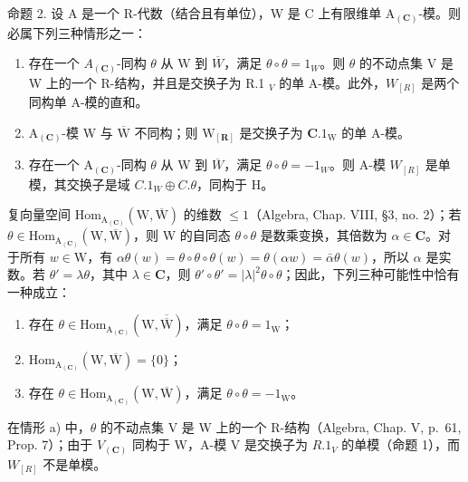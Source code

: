 命题 2. 设 A 是一个 R-代数（结合且有单位），W 是 C 上有限维单 \(\mathrm{A}_{(\mathbf{C})}\)-模。则必属下列三种情形之一：

\begin{enumerate}
\def\labelenumi{\alph{enumi})}
\item
  存在一个 \(A_{(\mathbf{C})}\)-同构 \(\theta\) 从 W 到 \(\overline{W}\)，满足 \(\theta \circ \theta = 1_{W}\)。则 \(\theta\) 的不动点集 V 是 W 上的一个 R-结构，并且是交换子为 R.1 \(_{V}\) 的单 A-模。此外，\(W_{[R]}\) 是两个同构单 A-模的直和。
\item
  \(\mathrm{A}_{(\mathbf{C})}\)-模 W 与 \(\overline{\mathrm{W}}\) 不同构；则 \(\mathrm{W}_{[\mathbf{R}]}\) 是交换子为 \(\mathbf{C}.1_{\mathrm{W}}\) 的单 A-模。
\item
  存在一个 \(\mathrm{A}_{(\mathbf{C})}\)-同构 \(\theta\) 从 W 到 \(\overline{W}\)，满足 \(\theta \circ \theta = -1_{W}\)。则 A-模 \(W_{[R]}\) 是单模，其交换子是域 \(C.1_{W} \oplus C.\theta\)，同构于 H。
\end{enumerate}

复向量空间 \(\mathrm{Hom}_{\mathrm{A}_{(\mathbf{C})}}(\mathrm{W},\overline{\mathrm{W}})\) 的维数 \(\leq 1\)（Algebra, Chap. VIII, §3, no. 2）；若 \(\theta \in \mathrm{Hom}_{\mathrm{A}_{(\mathbf{C})}}(\mathrm{W},\overline{\mathrm{W}})\)，则 W 的自同态 \(\theta \circ \theta\) 是数乘变换，其倍数为 \(\alpha \in \mathbf{C}\)。对于所有 \(w \in \mathrm{W}\)，有 \(\alpha \theta(w) = \theta \circ \theta \circ \theta(w) = \theta(\alpha w) = \bar{\alpha} \theta(w)\)，所以 \(\alpha\) 是实数。若 \(\theta' = \lambda \theta\)，其中 \(\lambda \in \mathbf{C}\)，则 \(\theta' \circ \theta' = |\lambda|^2 \theta \circ \theta\)；因此，下列三种可能性中恰有一种成立：

\begin{enumerate}
\def\labelenumi{\alph{enumi})}
\item
  存在 \(\theta \in \mathrm{Hom}_{\mathrm{A}_{(\mathbf{C})}}(\mathrm{W},\overline{\overline{\mathrm{W}}})\)，满足 \(\theta \circ \theta = 1_{\mathrm{W}}\)；
\item
  \(\mathrm{Hom}_{\mathrm{A}_{(\mathbf{C})}}(\mathrm{W},\overline{\mathrm{W}}) = \{0\}\)；
\item
  存在 \(\theta \in \mathrm{Hom}_{\mathrm{A}_{(\mathbf{C})}}(\mathrm{W},\overline{\mathrm{W}})\)，满足 \(\theta \circ \theta = -1_{\mathrm{W}}\)。
\end{enumerate}

在情形 a) 中，\(\theta\) 的不动点集 V 是 W 上的一个 R-结构（Algebra, Chap. V, p.~61, Prop. 7）；由于 \(V_{(\mathbf{C})}\) 同构于 W，A-模 V 是交换子为 \(R.1_{V}\) 的单模（命题 1），而 \(W_{[R]}\) 不是单模。

